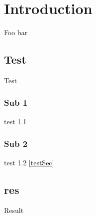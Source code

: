 
\chapter{Introduction}

Foo bar
\section{Test}
Test \label{testSec}
\subsection{Sub 1}
test 1.1
\subsection{Sub 2}
test 1.2
\ref{testSec}
\section{res}
Result
